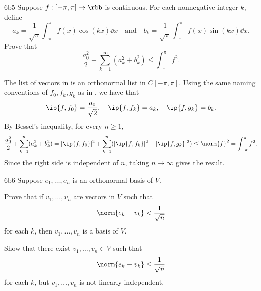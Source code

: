 \begin{exercise}{6b5}
    Suppose $f : [-\pi, \pi] \to \rbb$ is continuous.
    For each nonnegative integer $k$, define
    \[
        a_k = \frac{1}{\sqrt{\pi}} \int_{-\pi}^{\pi} f(x) \cos(kx)\dd x \quad \text{and} \quad b_k = \frac{1}{\sqrt{\pi}} \int_{-\pi}^{\pi} f(x) \sin(kx)\dd x.
    \]
    Prove that
    \[
        \frac{a_0^2}{2} + \sum_{k=1}^{\infty} (a_k^2 + b_k^2) \leq \int_{-\pi}^{\pi} f^2.
    \]
\end{exercise}

\begin{sol}
    The list of vectors in  is an orthonormal list in $C[-\pi, \pi]$.
    Using the same naming conventions of $f_0, f_k, g_k$ as in , we have that
    \[
        \ip{f, f_0} = \frac{a_0}{\sqrt{2}}, \quad
        \ip{f, f_k} = a_k, \quad
        \ip{f, g_k} = b_k.
    \]
    By Bessel's inequality, for every $n \geq 1$,
    \[
        \frac{a_0^2}{2} + \sum_{k=1}^{n}(a_k^2 + b_k^2) = |\ip{f, f_0}|^2 + \sum_{k=1}^{n}(|\ip{f, f_k}|^2 + |\ip{f, g_k}|^2) \leq \norm{f}^2 = \int_{-\pi}^{\pi} f^2.
    \]
    Since the right side is independent of $n$, taking $n \to \infty$ gives the result.
\end{sol}

\begin{exercise}{6b6}
    Suppose $e_1, \ldots, e_n$ is an orthonormal basis of $V$.
    \begin{subexercises}
        \item Prove that if $v_1, \ldots, v_n$ are vectors in $V$ such that
        \[
            \norm{e_k - v_k} < \frac{1}{\sqrt{n}}
        \]
        for each $k$, then $v_1, \ldots, v_n$ is a basis of $V$.
        \item Show that there exist $v_1, \ldots, v_n \in V$ such that
        \[
            \norm{e_k - v_k} \leq \frac{1}{\sqrt{n}}
        \]
        for each $k$, but $v_1, \ldots, v_n$ is not linearly independent.
    \end{subexercises}
\end{exercise}

